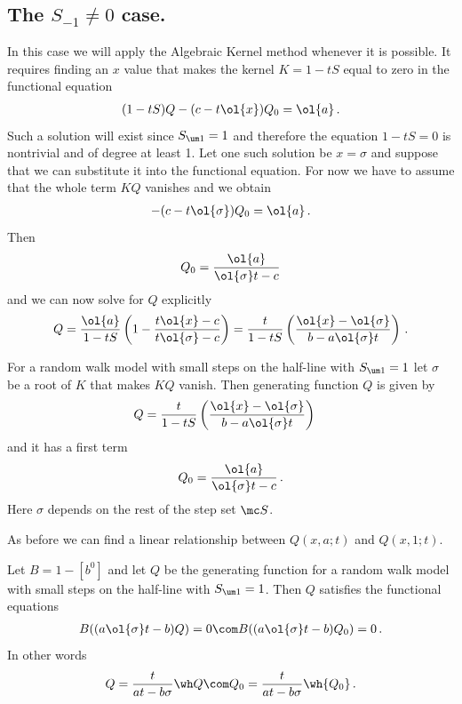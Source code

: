 \subsection{The $S_{-1} \neq 0$ case.}
In this case we will apply the Algebraic Kernel method whenever it is possible. It requires finding an $x$ value that makes the kernel $K = 1 - tS$ equal to zero in the functional equation
\begin{align}
	(1-tS)Q - (c -t\ol{x})Q_0 = \ol{a}\,.
\end{align}
Such a solution will exist since $S_{\um 1} = 1$ and therefore the equation $1 - tS = 0$ is nontrivial and of degree at least 1. Let one such solution be $x = \sigma$ and suppose that we can substitute it into the functional equation. For now we have to assume that the whole term $KQ$ vanishes and we obtain
\begin{align}
	- (c - t\ol{\sigma})Q_0 = \ol{a}\,.
\end{align}
Then
\begin{align}
	Q_0 = \frac{\ol{a}}{\ol{\sigma}t-c}
\end{align}
and we can now solve for $Q$ explicitly
\begin{align}
	Q = \frac{\ol{a}}{1-tS}\left(1 - \frac{t\ol{x}-c}{t\ol{\sigma}-c}\right) = \frac{t}{1-tS}\left(\frac{\ol{x}-\ol{\sigma}}{b-a\ol{\sigma}t}\right)\,.
\end{align}
\begin{prop} For a random walk model with small steps on the half-line with $S_{\um 1} = 1$ let $\sigma$ be a root of $K$ that makes $KQ$ vanish. Then generating function $Q$ is given by
\begin{align}
	Q &= \frac{t}{1-tS}\left(\frac{\ol{x}-\ol{\sigma}}{b-a\ol{\sigma}t}\right)
\end{align}
and it has a first term
\begin{align}
	Q_0 = \frac{\ol{a}}{\ol{\sigma}t-c}\,.
\end{align}
Here $\sigma$ depends on the rest of the step set $\mc S$.
\end{prop}
As before we can find a linear relationship between $Q(x,a;t)$ and $Q(x,1;t)$.
\begin{prop} Let $B = 1 - [b^0]$ and let $Q$ be the generating function for a random walk model with small steps on the half-line with $S_{\um 1} = 1$. Then $Q$ satisfies the functional equations
\begin{align}
	B((a\ol{\sigma}t-b)Q) = 0\com B((a\ol{\sigma}t-b)Q_0) = 0\,.
\end{align}
In other words
\begin{align}
	Q = \frac{t}{at-b\sigma}\wh Q \com Q_0 = \frac{t}{at-b\sigma}\wh{Q_0}\,.
\end{align}
\end{prop}

